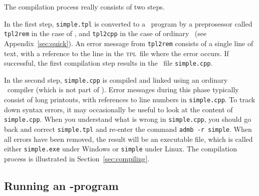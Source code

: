 \documentclass{admbmanual}
\begin{document}
The compilation process really consists of two steps.

In the first step, \texttt{simple.tpl} is converted to a \cplus\ program by
a preprosessor called \texttt{tpl2rem} in the case of \scAR, and \texttt{tpl2cpp} in the case of ordinary \scAB\ (see Appendix~\ref{sec:quick}). 
An error message from \texttt{tpl2rem} consists of a 
single line of text, with a reference to the line in the  \textsc{tpl}~file where the error occurs. 
If successful, the first compilation step results in
the \cplus\ file \texttt{simple.cpp}. 

In the second step, \texttt{simple.cpp} is compiled and linked using an
ordinary \cplus\ compiler (which is not part of \scAB). Error messages during this phase typically consist of long
printouts, with references to line numbers in \texttt{simple.cpp}. To track down syntax errors, it may
occasionally be useful to look at the content of \texttt{simple.cpp}. When you understand what is wrong in
\texttt{simple.cpp}, you should go back and correct \texttt{simple.tpl} and re-enter the command \texttt{admb -r
simple}. When all errors have been removed, the result will be an executable file, which is called either
\texttt{simple.exe} under Windows or \texttt{simple} under Linux. The compilation process is
illustrated in Section~\ref{sec:compiling}.


\subsection{Running an \scAB-program}
\end{document}

